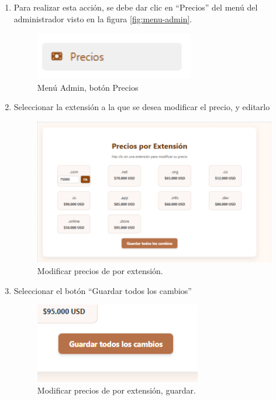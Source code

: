 \begin{enumerate}
    \item Para realizar esta acción, se debe dar clic en “Precios” del menú del administrador visto en la figura \ref{fig:menu-admin}.
    \begin{figure}[H]
        \centering
        \includegraphics[width=0.3\linewidth]{guiamodulo/menu-admin-precios.png}
        \caption{Menú Admin, botón Precios}
        \label{fig:menu-admin-precios}
    \end{figure}

    \item Seleccionar la extensión a la que se desea modificar el precio, y editarlo
    \begin{figure}[H]
        \centering
        \includegraphics[width=0.7\linewidth]{guiamodulo/mod-precios.png}
        \caption{Modificar precios de por extensión.}
        \label{fig:mod-precios}
    \end{figure}

     \item Seleccionar el botón “Guardar todos los cambios”
    \begin{figure}[H]
        \centering
        \includegraphics[width=0.4\linewidth]{guiamodulo/mod-precios-guardar.png}
        \caption{Modificar precios de por extensión, guardar.}
        \label{fig:mod-precios-guardar}
    \end{figure}


\end{enumerate}
